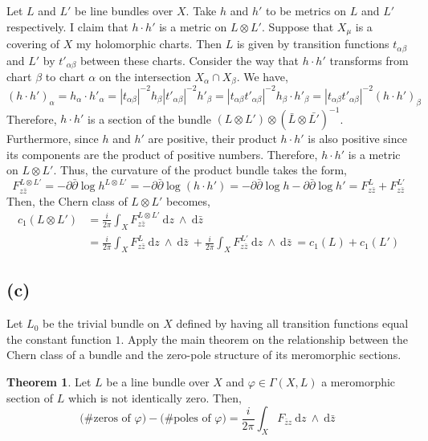 \documentclass[12pt]{extarticle}
\renewcommand{\d}[1]{\: \mathrm{d}#1 \:}
\theoremstyle{definition}
\newtheorem{theorem}{Theorem}[section]
\begin{document}
Let $L$ and $L'$ be line bundles over $X$. Take $h$ and $h'$ to be metrics on $L$ and $L'$ respectively. I claim that $h \cdot h'$ is a metric on $L \otimes L'$. Suppose that $X_{\mu}$ is a covering of $X$ my holomorphic charts. Then $L$ is given by transition functions $t_{\alpha \beta}$ and $L'$ by $t'_{\alpha \beta}$ between these charts. Consider the way that $h \cdot h'$ transforms from chart $\beta$ to chart $\alpha$ on the intersection $X_{\alpha} \cap X_{\beta}$. We have,
\[ (h \cdot h')_{\alpha} = h_{\alpha} \cdot h'_{\alpha} = |t_{\alpha \beta}|^{-2} h_{\beta} |t'_{\alpha \beta}|^{-2} h'_{\beta} = |t_{\alpha \beta} t'_{\alpha \beta}|^{-2} h_{\beta} \cdot h'_{\beta} = |t_{\alpha \beta} t'_{\alpha \beta}|^{-2} (h \cdot h')_{\beta} \]   
Therefore, $h \cdot h'$ is a section of the bundle $(L \otimes L') \otimes (\bar{L} \otimes \bar{L'})^{-1}$. Furthermore, since $h$ and $h'$ are positive, their product $h \cdot h'$ is also positive since its components are the product of positive numbers. Therefore, $h \cdot h'$ is a metric on $L \otimes L'$. Thus, the curvature of the product bundle takes the form,
\[ F^{L \otimes L'}_{z \bar{z}} = - \partial \bar{\partial} \log{h^{L \otimes L'}} = - \partial \bar{\partial} \log{(h \cdot h')} = - \partial \bar{\partial} \log{h} - \partial \bar{\partial} \log{h'} = F^{L}_{z \bar{z}} + F^{L'}_{z \bar{z}} \]
Then, the Chern class of $L \otimes L'$ becomes,
\begin{align*}
c_1(L \otimes L') & = \frac{i}{2 \pi} \int_X F^{L \otimes L'}_{z \bar{z}} \d{z} \wedge \d{\bar{z}}
\\
& = \frac{i}{2 \pi} \int_X F^{L}_{z \bar{z}} \d{z} \wedge \d{\bar{z}} + \frac{i}{2 \pi} \int_X F^{L'}_{z \bar{z}} \d{z} \wedge \d{\bar{z}} = c_1(L) + c_1(L') 
\end{align*}

\subsection*{(c)}

Let $L_0$ be the trivial bundle on $X$ defined by having all transition functions equal the constant function $1$. Apply the main theorem on the relationship between the Chern class of a bundle and the zero-pole structure of its meromorphic sections.

\begin{theorem}
Let $L$ be a line bundle over $X$ and $\varphi \in \Gamma(X, L)$ a meromorphic section of $L$ which is not identically zero. Then,
\[ \text{(\# zeros of $\varphi$)} - \text{(\# poles of $\varphi$)} = \frac{i}{2 \pi} \int_X F_{\bar{z} z} \d{z} \wedge \d{\bar{z}} \]
\end{theorem}
\end{document}
